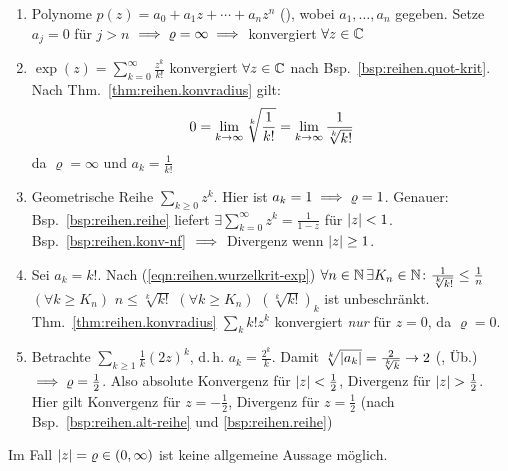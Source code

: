\documentclass[12pt]{scrreprt}
\begin{document}
\begin{bsp}\label{bsp:reihen.konvradius}
\begin{enumerate}
\item Polynome $p(z) = a_0 + a_1z + \dotsb + a_nz^n$ (), wobei $a_1, \dotsc, a_n$ gegeben.
Setze $a_j = 0$ für $j > n$ $\implies \varrho = \infty \implies$ konvergiert $\forall z\in\mathbb{C}$

\item $\exp(z) = \sum_{k=0}^\infty \frac{z^k}{k!}$ konvergiert $\forall z\in\mathbb{C}$ nach Bsp.~\ref{bsp:reihen.quot-krit}.
Nach Thm.~\ref{thm:reihen.konvradius} gilt: 
\begin{equation}\label{eqn:reihen.wurzelkrit-exp}
0 = \lim_{k\rightarrow\infty} \sqrt[k]{\frac{1}{k!}} = \lim_{k\rightarrow\infty} \frac{1}{\sqrt[k]{k!}}
\end{equation}
da $\varrho = \infty$ und $a_k = \frac{1}{k!}$

\item Geometrische Reihe $\sum_{k \ge 0} z^k$. Hier ist $a_k = 1 \implies \varrho = 1$. Genauer: Bsp.~\ref{bsp:reihen.reihe}
liefert $\exists \sum_{k=0}^\infty z^k = \frac{1}{1-z}$ für $\left\lvert z\right\lvert < 1$. Bsp.~\ref{bsp:reihen.konv-nf} $\implies$ Divergenz
wenn $\left\lvert z\right\lvert \ge 1$.

\item Sei $a_k = k!$. Nach (\ref{eqn:reihen.wurzelkrit-exp}) $\forall n\in\mathbb{N}\,\exists K_n\in\mathbb{N}\colon \frac{1}{\sqrt[k]{k!}} \le \frac{1}{n}$ 
$(\forall k \ge K_n)$ \folgt $n \le \sqrt[k]{k!}$ $(\forall k \ge K_n)$ \folgt $(\sqrt[k]{k!})_k$ ist unbeschränkt. 
Thm.~\ref{thm:reihen.konvradius} \folgt $\sum_k k! z^k$ konvergiert \emph{nur} für $z=0$, da $\varrho=0$.

\item Betrachte $\sum_{k \ge 1} \frac{1}{k} (2z)^k$, d.\,h. $a_k = \frac{2^k}{k}$. 
Damit $\sqrt[k]{\left\lvert a_k\right\lvert} = \frac{2}{\sqrt[k]{k}} \rightarrow 2$ (\kinf, Üb.)
$\implies \varrho = \frac{1}{2}$. Also absolute Konvergenz für $\left\lvert z\right\lvert < \frac{1}{2}$, Divergenz für $\left\lvert z\right\lvert > \frac{1}{2}$.
Hier gilt Konvergenz für $z = -\frac{1}{2}$, Divergenz für $z = \frac{1}{2}$ (nach Bsp.~\ref{bsp:reihen.alt-reihe} und 
\ref{bsp:reihen.reihe})
\end{enumerate}
\end{bsp}

\begin{bem*}
Im Fall $\left\lvert z\right\lvert = \varrho \in (0, \infty)$ ist keine allgemeine Aussage möglich.
\end{bem*}
\end{document}
